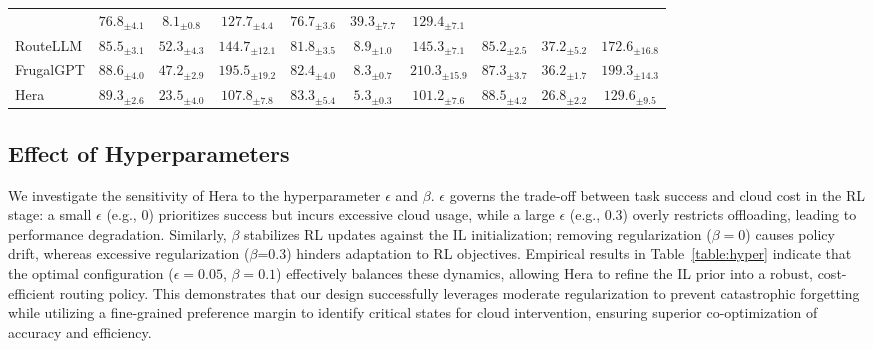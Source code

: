 \documentclass{article}
\newcommand{\name}{Hera\xspace}
\begin{document}
\begin{table}[h]
\begin{tabular}{l ccc | ccc | ccc}
         & $76.8_{\pm 4.1}$ & $8.1_{\pm 0.8}$ & $127.7_{\pm 4.4}$ 
         & $76.7_{\pm 3.6}$ & $39.3_{\pm 7.7}$ & $129.4_{\pm 7.1}$ \\
RouteLLM  & $85.5_{\pm 3.1}$ & $52.3_{\pm 4.3}$ & $144.7_{\pm 12.1}$
         & $81.8_{\pm 3.5}$ & $8.9_{\pm 1.0}$ & $145.3_{\pm 7.1}$ 
         & $85.2_{\pm 2.5}$ & $37.2_{\pm 5.2}$ & $172.6_{\pm 16.8}$ \\
FrugalGPT & $88.6_{\pm 4.0}$ & $47.2_{\pm 2.9}$ & $195.5_{\pm 19.2}$
         & $82.4_{\pm 4.0}$ & $8.3_{\pm 0.7}$ & $210.3_{\pm 15.9}$ 
         & $87.3_{\pm 3.7}$ & $36.2_{\pm 1.7}$ & $199.3_{\pm 14.3}$ \\
\cellcolor{blue!10}\name 
         & \cellcolor{blue!10}$89.3_{\pm 2.6}$ & \cellcolor{blue!10}$23.5_{\pm 4.0}$ & \cellcolor{blue!10}$107.8_{\pm 7.8}$ 
         & \cellcolor{blue!10}$83.3_{\pm 5.4}$ & \cellcolor{blue!10}$5.3_{\pm 0.3}$ & \cellcolor{blue!10}$101.2_{\pm 7.6}$ 
         & \cellcolor{blue!10}$88.5_{\pm 4.2}$ & \cellcolor{blue!10}$26.8_{\pm 2.2}$ & \cellcolor{blue!10}$129.6_{\pm 9.5}$ \\
\bottomrule
\end{tabular}
\label{table:model_pair}
\vspace{-1em}  %
\end{table}


\subsection{Effect of Hyperparameters}
\label{appdendix:hyper}
We investigate the sensitivity of \name to the  hyperparameter $\epsilon$ and $\beta$. $\epsilon$ governs the trade-off between task success and cloud cost in the RL stage: a small $\epsilon$ (e.g., 0) prioritizes success but incurs excessive cloud usage, while a large $\epsilon$ (e.g., 0.3) overly restricts offloading, leading to performance degradation. Similarly, $\beta$ stabilizes RL updates against the IL initialization; removing regularization ($\beta=0$) causes policy drift, whereas excessive regularization ($\beta$=0.3) hinders adaptation to RL objectives.
Empirical results in Table~\ref{table:hyper} indicate that the optimal configuration ($\epsilon=0.05$, $\beta=0.1$) effectively balances these dynamics, allowing \name to refine the IL prior into a robust, cost-efficient routing policy. This demonstrates that our design successfully leverages moderate regularization to prevent catastrophic forgetting while utilizing a fine-grained preference margin to identify critical states for cloud intervention, ensuring superior co-optimization of accuracy and efficiency.
\end{document}
